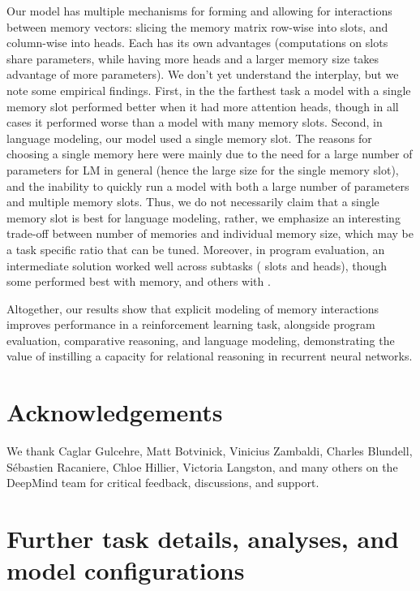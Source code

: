 \documentclass{article}
\begin{document}
Our model has multiple mechanisms for forming and allowing for interactions between memory vectors: slicing the memory matrix row-wise into slots, and column-wise into heads. Each has its own advantages (computations on slots share parameters, while having more heads and a larger memory size takes advantage of more parameters). We don't yet understand the interplay, but we note some empirical findings. First, in the the  farthest task a model with a single memory slot performed better when it had more attention heads, though in all cases it performed worse than a model with many memory slots. Second, in language modeling, our model used a single memory slot. The reasons for choosing a single memory here were mainly due to the need for a large number of parameters for LM in general (hence the large size for the single memory slot), and the inability to quickly run a model with both a large number of parameters and multiple memory slots. Thus, we do not necessarily claim that a single memory slot is best for language modeling, rather, we emphasize an interesting trade-off between number of memories and individual memory size, which may be a task specific ratio that can be tuned. Moreover, in program evaluation, an intermediate solution worked well across subtasks ( slots and heads), though some performed best with  memory, and others with . 

Altogether, our results show that explicit modeling of memory interactions improves performance in a reinforcement learning task, alongside program evaluation, comparative reasoning, and language modeling, demonstrating the value of instilling a capacity for relational reasoning in recurrent neural networks.  
\section*{Acknowledgements}
We thank Caglar Gulcehre, Matt Botvinick, Vinicius Zambaldi, Charles Blundell, S\'ebastien Racaniere, Chloe Hillier, Victoria Langston, and many others on the DeepMind team for critical feedback, discussions, and support.

\clearpage
\small



\clearpage
\appendix

\section{Further task details, analyses, and model configurations}
\end{document}
